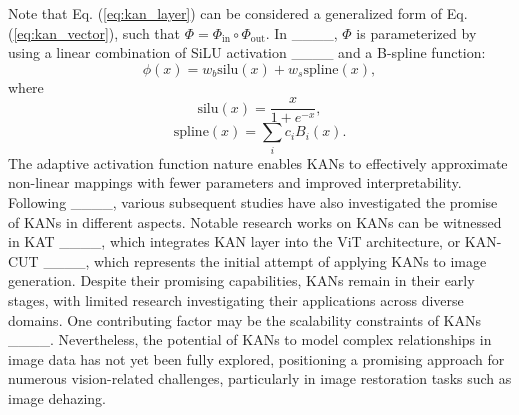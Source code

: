 Note that Eq. (\ref{eq:kan_layer}) can be considered a generalized form of Eq. (\ref{eq:kan_vector}), such that $\Phi = \Phi_{\text{in}}\circ \Phi_{\text{out}}$. In ____, $\Phi$ is parameterized by using a linear combination of SiLU activation ____ and a B-spline function:
\begin{equation}
        \phi(x) = w_b \mathrm{silu}(x) + w_s \mathrm{spline}(x),
\end{equation}
where
\begin{equation}
\mathrm{silu}(x) = \frac{x}{1+e^{-x}}, 
\end{equation}
\begin{equation}
\mathrm{spline}(x)=\sum_i c_i B_i(x).
\end{equation}
The adaptive activation function nature enables KANs to effectively approximate non-linear mappings with fewer parameters and improved interpretability. Following ____, various subsequent studies have also investigated the promise of KANs in different aspects. Notable research works on KANs can be witnessed in KAT ____, which integrates KAN layer into the ViT architecture, or KAN-CUT ____, which represents the initial attempt of applying KANs to image generation. Despite their promising capabilities, KANs remain in their early stages, with limited research investigating their applications across diverse domains. One contributing factor may be the scalability constraints of KANs ____. Nevertheless, the potential of KANs to model complex relationships in image data has not yet been fully explored, positioning a promising approach for numerous vision-related challenges, particularly in image restoration tasks such as image dehazing.


